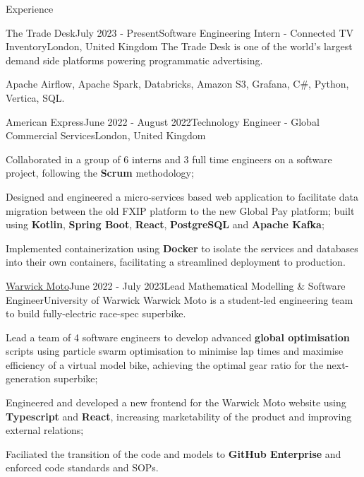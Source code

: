 \documentclass{resume}
\begin{document}
    \begin{rSection}{Experience}
        \begin{rSubsection}{The Trade Desk}{July 2023 - Present}{Software Engineering Intern - Connected TV Inventory}{London, United Kingdom}
            {The Trade Desk is one of the world's largest demand side platforms powering programmatic advertising.}
            \item Apache Airflow, Apache Spark, Databricks, Amazon S3, Grafana, C\#, Python, Vertica, SQL. 
        \end{rSubsection}

        \begin{rSubsection}{American Express}{June 2022 - August 2022}{Technology Engineer - Global Commercial Services}{London, United Kingdom}{}
            \item Collaborated in a group of 6 interns and 3 full time engineers on a software project, following the \textbf{Scrum} methodology;
            \item Designed and engineered a micro-services based web application to facilitate data migration between the old FXIP platform to the new Global Pay platform; built using \textbf{Kotlin}, \textbf{Spring Boot}, \textbf{React}, \textbf{PostgreSQL} and \textbf{Apache Kafka};
            \item Implemented containerization using \textbf{Docker} to isolate the services and databases into their own containers, facilitating a streamlined deployment to production.
        \end{rSubsection}


        \begin{rSubsection}{{\href{https://warwick.ac.uk/fac/sci/wmg/education/undergraduate/student-projects/warwick-moto/}{Warwick Moto}}}{June 2022 - July 2023}{Lead Mathematical Modelling \& Software Engineer}{University of Warwick}
            {Warwick Moto is a student-led engineering team to build fully-electric race-spec superbike.}
            \item Lead a team of 4 software engineers to develop advanced \textbf{global optimisation} scripts using particle swarm optimisation to minimise lap times and maximise efficiency of a virtual model bike, achieving the optimal gear ratio for the next-generation superbike;
            \item Engineered and developed a new frontend for the Warwick Moto website using \textbf{Typescript} and \textbf{React}, increasing marketability of the product and improving external relations;
            \item Faciliated the transition of the code and models to \textbf{GitHub Enterprise} and enforced code standards and SOPs.
        \end{rSubsection}


\end{rSection}
\end{document}
